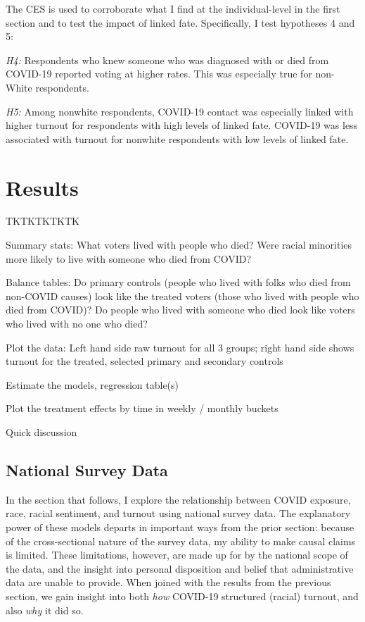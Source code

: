 \documentclass[
  12pt,
]{article}
\begin{document}
The CES is used to corroborate what I find at the individual-level in the first section and to test the impact of linked fate. Specifically, I test hypotheses 4 and 5:

\emph{H4:} Respondents who knew someone who was diagnosed with or died from COVID-19 reported voting at higher rates. This was especially true for non-White respondents.

\emph{H5:} Among nonwhite respondents, COVID-19 contact was especially linked with higher turnout for respondents with high levels of linked fate. COVID-19 was less associated with turnout for nonwhite respondents with low levels of linked fate.

\hypertarget{results}{%
\section*{Results}\label{results}}

TKTKTKTKTK

Summary stats: What voters lived with people who died? Were racial minorities more likely to live with someone who died from COVID?

Balance tables: Do primary controls (people who lived with folks who died from non-COVID causes) look like the treated voters (those who lived with people who died from COVID)? Do people who lived with someone who died look like voters who lived with no one who died?

Plot the data: Left hand side raw turnout for all 3 groups; right hand side shows turnout for the treated, selected primary and secondary controls

Estimate the models, regression table(s)

Plot the treatment effects by time in weekly / monthly buckets

Quick discussion

\hypertarget{national-survey-data-1}{%
\subsection*{National Survey Data}\label{national-survey-data-1}}

In the section that follows, I explore the relationship between COVID exposure, race, racial sentiment, and turnout using national survey data. The explanatory power of these models departs in important ways from the prior section: because of the cross-sectional nature of the survey data, my ability to make causal claims is limited. These limitations, however, are made up for by the national scope of the data, and the insight into personal disposition and belief that administrative data are unable to provide. When joined with the results from the previous section, we gain insight into both \emph{how} COVID-19 structured (racial) turnout, and also \emph{why} it did so.
\end{document}
